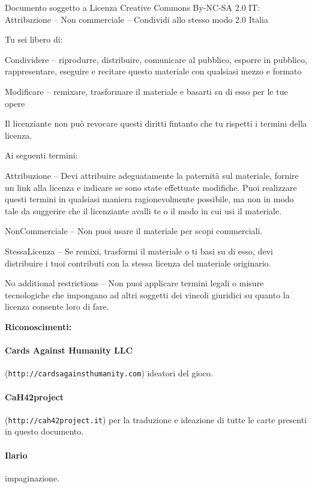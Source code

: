 \documentclass[a4paper,12pt]{article}
\begin{document}
\medskip
\noindent
Documento soggetto a Licenza Creative Commons By-NC-SA 2.0 IT: \\ 
\indent
Attribuzione -- Non commerciale -- Condividi allo stesso modo 2.0 Italia

\bigskip

\noindent
Tu sei libero di:

    Condividere -- riprodurre, distribuire, comunicare al pubblico, esporre in pubblico, rappresentare, eseguire e recitare questo materiale con qualsiasi mezzo e formato
\indent

    Modificare -- remixare, trasformare il materiale e basarti su di esso per le tue opere
\indent

    Il licenziante non può revocare questi diritti fintanto che tu rispetti i termini della licenza.
\medskip

\noindent
Ai seguenti termini:

    Attribuzione -- Devi attribuire adeguatamente la paternità sul materiale, fornire un link alla licenza e indicare se sono state effettuate modifiche. Puoi realizzare questi termini in qualsiasi maniera ragionevolmente possibile, ma non in modo tale da suggerire che il licenziante avalli te o il modo in cui usi il materiale.
\indent

    NonCommerciale -- Non puoi usare il materiale per scopi commerciali.
\indent

    StessaLicenza -- Se remixi, trasformi il materiale o ti basi su di esso, devi distribuire i tuoi contributi con la stessa licenza del materiale originario.
\indent

    No additional restrictions -- Non puoi applicare termini legali o misure tecnologiche che impongano ad altri soggetti dei vincoli giuridici su quanto la licenza consente loro di fare.

\bigskip\bigskip

\begin{center}\bf{Riconoscimenti:}\end{center}

\paragraph{Cards Against Humanity LLC} (\texttt{http://cardsagainsthumanity.com}) ideatori del gioco.

\paragraph{CaH42project} (\texttt{http://cah42project.it}) per la traduzione e ideazione di tutte le carte presenti in questo documento.

\paragraph{Ilario} impaginazione.
\end{document}
